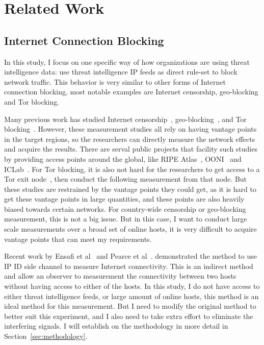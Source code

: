 \section{Related Work}

\subsection{Internet Connection Blocking}
In this study, I focus on one specific way of how organizations are using 
threat intelligence data: use threat intelligence IP feeds as direct rule-set 
to block network traffic. This behavior is very similar to other forms of
Internet connection blocking, most notable examples are Internet censorship,
geo-blocking and Tor blocking.

Many previous work has studied Internet censorship~\cite{aryan2013internet,
park2010empirical,anderson2012splinternet,zittrain2003internet,
clayton2006ignoring}, geo-blocking~\cite{opennetsurvey, mcdonald2018403,afroz2018exploring}, 
and Tor blocking~\cite{singh2017characterizing, khattak2016you}. However, 
these measurement studies all rely on having vantage points in the target 
regions, so the researchers can directly measure the network effects and 
acquire the results. There are serval public projects that facility such 
studies by providing access points around the global, like RIPE
Atlas~\cite{ripeatlas}, OONI~\cite{ooni} and ICLab~\cite{iclab}.
For Tor blocking, it is also not hard for the researchers to get access 
to a Tor exit node~\cite{khattak2016you}, then conduct the following 
measurement from that node. But these studies are restrained by the vantage
points they could get, as it is hard to get these vantage points in large
quantities, and these points are also heavily biased towards certain networks.
For country-wide censorship or geo-blocking measurement, this is not a big
issue. But in this case, I want to conduct large scale measurements over a 
broad set of online hosts, it is very difficult to acquire vantage points 
that can meet my requirements.

Recent work by Ensafi et al~\cite{ensafi2014detecting} and Pearce et 
al~\cite{pearce2017augur}. demonstrated the method to use IP ID side 
channel to measure Internet connectivity. This is an indirect method 
and allow an observer to measurement the connectivity between two hosts 
without having access to either of the hosts. In this study, I do not 
have access to either threat intelligence feeds, or large amount of 
online hosts, this method is an ideal method for this measurement. But 
I need to modify the original method to better suit this experiment, 
and I also need to take extra effort to eliminate the interfering 
signals. I will establish on the methodology in more detail in
Section~\ref{sec:methodology}.

